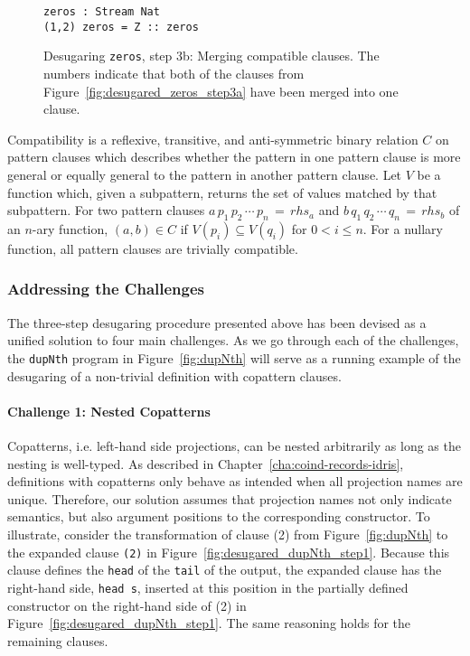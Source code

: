 \begin{figure}
\begin{lstlisting}[mathescape]
zeros : Stream Nat
(1,2) zeros = Z :: zeros 
\end{lstlisting}
  \caption{Desugaring \texttt{zeros}, step 3b: Merging compatible clauses. The
    numbers indicate that both of the clauses from
    Figure~\ref{fig:desugared_zeros_step3a} have been merged into one clause.}
  \label{fig:desugared_zeros_step3b}
\end{figure}

\begin{definition}
\label{def:compatibility}
  Compatibility is a reflexive, transitive, and anti-symmetric binary relation
  $C$ on pattern clauses which describes whether the pattern in one pattern
  clause is more general or equally general to the pattern in another pattern
  clause. Let $V$ be a function which, given a subpattern, returns the set of
  values matched by that subpattern. For two pattern clauses
  $a\,p_{1}\,p_{2}\,\cdots\,p_{n}\,=\,rhs_{a}$ and
  $b\,q_{1}\,q_{2}\,\cdots\,q_{n}\,=\,rhs_{b}$ of an $n$-ary function,
  $(a,b)\in C$ if $V(p_{i})\subseteq V(q_{i})$ for $0 < i\le n$. For a nullary
  function, all pattern clauses are trivially compatible.
\end{definition}

\subsubsection{Addressing the Challenges}
The three-step desugaring procedure presented above has been devised as a
unified solution to four main challenges. As we go through each of the
challenges, the \texttt{dupNth} program in Figure~\ref{fig:dupNth} will serve as
a running example of the desugaring of a non-trivial definition with copattern
clauses.

\paragraph{Challenge 1: Nested Copatterns}
Copatterns, i.e. left-hand side projections, can be nested arbitrarily as long
as the nesting is well-typed. As described in
Chapter~\ref{cha:coind-records-idris}, definitions with copatterns only behave
as intended when all projection names are unique. Therefore, our solution
assumes that projection names not only indicate semantics, but also argument
positions to the corresponding constructor. To illustrate, consider the
transformation of clause (2) from Figure~\ref{fig:dupNth} to the expanded clause
\texttt{(2)} in Figure~\ref{fig:desugared_dupNth_step1}. Because this clause
defines the \texttt{head} of the \texttt{tail} of the output, the expanded
clause has the right-hand side, \texttt{head~s}, inserted at this position in
the partially defined constructor on the right-hand side of (2) in
Figure~\ref{fig:desugared_dupNth_step1}. The same reasoning holds for the remaining clauses.

